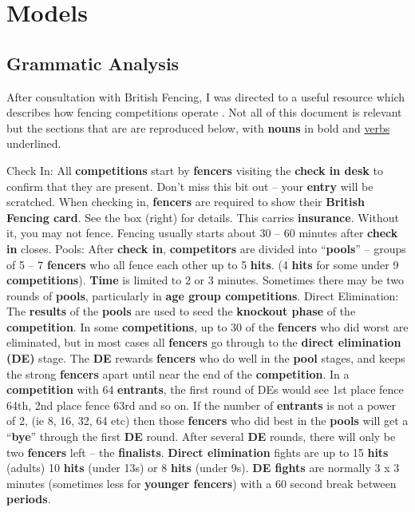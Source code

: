 \chapter{Models}
\section{Grammatic Analysis}
After consultation with British Fencing, I was directed to a useful resource
which describes how fencing competitions operate \citep{bf-comp-guide}. Not
all of this document is relevant but the sections that are are reproduced
below, with \textbf{nouns} in bold and \underline{verbs} underlined.


Check In: All \textbf{competitions} start by \textbf{fencers}
visiting the \textbf{check in desk} to confirm that they
are present. Don’t miss this bit out – your \textbf{entry}
will be scratched.
When checking in, \textbf{fencers} are required to show
their \textbf{British Fencing card}. See the box (right) for
details. This carries \textbf{insurance}. Without it, you
may not fence.
Fencing usually starts about 30 – 60 minutes
after \textbf{check in} closes.
Pools: After \textbf{check in}, \textbf{competitors} are divided
into “\textbf{pools}” – groups of 5 – 7 \textbf{fencers} who all
fence each other up to 5 \textbf{hits}. (4 \textbf{hits} for some
under 9 \textbf{competitions}). \textbf{Time} is limited to 2 or 3
minutes. Sometimes there may be two rounds of
\textbf{pools}, particularly in \textbf{age group competitions}.
Direct Elimination: The \textbf{results} of the \textbf{pools}
are used to seed the \textbf{knockout phase} of the
\textbf{competition}. In some \textbf{competitions}, up to 30%
of the \textbf{fencers} who did worst are eliminated, but
in most cases all \textbf{fencers} go through to the \textbf{direct
elimination (DE)} stage.
The \textbf{DE} rewards \textbf{fencers} who do well in the
\textbf{pool} stages, and keeps the strong \textbf{fencers} apart
until near the end of the \textbf{competition}. In a
\textbf{competition} with 64 \textbf{entrants}, the first round of
DEs would see 1st place fence 64th, 2nd place
fence 63rd and so on. If the number of
\textbf{entrants} is not a power of 2, (ie 8, 16, 32, 64
etc) then those \textbf{fencers} who did best in the \textbf{pools}
will get a “\textbf{bye}” through the first \textbf{DE} round. After
several \textbf{DE} rounds, there will only be two \textbf{fencers}
left – the \textbf{finalists}.
\textbf{Direct elimination} fights are up to 15 \textbf{hits} (adults)
10 \textbf{hits} (under 13s) or 8 \textbf{hits} (under 9s). \textbf{DE fights}
are normally 3 x 3 minutes (sometimes less for \textbf{younger
fencers}) with a 60 second break between \textbf{periods}.

